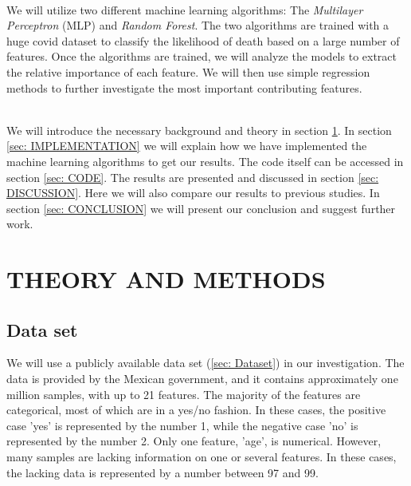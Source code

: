 \documentclass[english,notitlepage,reprint,nofootinbib]{revtex4-1}  %
\begin{document}
\\
 We will utilize two different machine learning algorithms: The \textit{Multilayer Perceptron} (MLP) and \textit{Random Forest}. The two algorithms are trained with a huge covid dataset to classify the likelihood of death based on a large number of features. Once the algorithms are trained, we will analyze the models to extract the relative importance of each feature. We will then use simple regression methods to further investigate the most important contributing features. %
 
\\
We will introduce the necessary background and theory in section \ref{sec: METHODS}. In section \ref{sec: IMPLEMENTATION} we will explain how we have implemented the machine learning algorithms to get our results. The code itself can be accessed in section \ref{sec: CODE}. The results are presented and discussed in section \ref{sec: DISCUSSION}. Here we will also compare our results to previous studies. In section \ref{sec: CONCLUSION} we will present our conclusion and suggest further work. 

\section{THEORY AND METHODS}
\label{sec: METHODS}


\subsection{Data set}\label{subsec: DATA}
We will use a publicly available data set (\ref{sec: Dataset}) in our investigation. The data is provided by the Mexican government, and it contains approximately one million samples, with up to 21 features. The majority of the features are categorical, most of which are in a yes/no fashion. In these cases, the positive case 'yes' is represented by the number 1, while the negative case 'no' is represented by the number 2. Only one feature, 'age', is numerical. 
However, many samples are lacking information on one or several features. In these cases, the lacking data is represented by a number between 97 and 99. %
\end{document}
